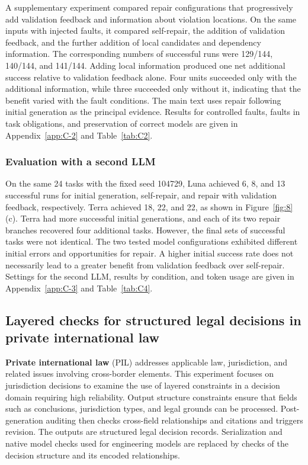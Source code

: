 \documentclass[pdflatex,iicol,sn-mathphys-num]{sn-jnl}
\begin{document}
A supplementary experiment compared repair configurations that progressively add validation feedback and information about violation locations. On the same inputs with injected faults, it compared self-repair, the addition of validation feedback, and the further addition of local candidates and dependency information. The corresponding numbers of successful runs were 129/144, 140/144, and 141/144. Adding local information produced one net additional success relative to validation feedback alone. Four units succeeded only with the additional information, while three succeeded only without it, indicating that the benefit varied with the fault conditions. The main text uses repair following initial generation as the principal evidence. Results for controlled faults, faults in task obligations, and preservation of correct models are given in Appendix~\ref{app:C-2} and Table~\ref{tab:C2}.


\subsubsection{Evaluation with a second LLM}\label{sec:eval-4-4-3}

On the same 24 tasks with the fixed seed 104729, Luna achieved 6, 8, and 13 successful runs for initial generation, self-repair, and repair with validation feedback, respectively. Terra achieved 18, 22, and 22, as shown in Figure~\ref{fig:8}(c). Terra had more successful initial generations, and each of its two repair branches recovered four additional tasks. However, the final sets of successful tasks were not identical. The two tested model configurations exhibited different initial errors and opportunities for repair. A higher initial success rate does not necessarily lead to a greater benefit from validation feedback over self-repair. Settings for the second LLM, results by condition, and token usage are given in Appendix~\ref{app:C-3} and Table~\ref{tab:C4}.


\subsection{Layered checks for structured legal decisions in private international law}\label{sec:eval-4-5}

\textbf{Private international law} (PIL) addresses applicable law, jurisdiction, and related issues involving cross-border elements. This experiment focuses on jurisdiction decisions to examine the use of layered constraints in a decision domain requiring high reliability. Output structure constraints ensure that fields such as conclusions, jurisdiction types, and legal grounds can be processed. Post-generation auditing then checks cross-field relationships and citations and triggers revision. The outputs are structured legal decision records. Serialization and native model checks used for engineering models are replaced by checks of the decision structure and its encoded relationships.
\end{document}
